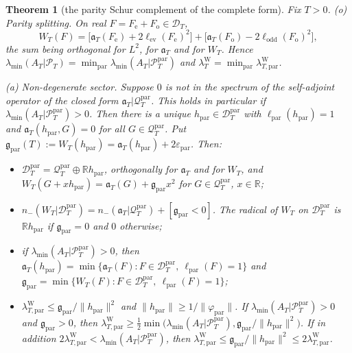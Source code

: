 \documentclass[11pt]{amsart}
\newtheorem{theorem}{Theorem}[section]
\theoremstyle{definition}
\theoremstyle{remark}
\newcommand{\R}{\mathbb R}
\newcommand{\PT}{\mathcal P_T}
\newcommand{\lamW}{\lambda^{\mathrm W}_T}
\newcommand{\lamA}{\lambda_{\min}(A_T|\PT)}
\begin{document}
\begin{theorem}[the parity Schur complement of the complete form]\label{thm:parityschur}
Fix $T>0$.
\emph{(o) Parity splitting.} On real $F=F_{\mathrm e}+F_{\mathrm o}\in\mathcal D_T$,
\[
W_T(F)=\big[\mathfrak a_T(F_{\mathrm e})+2\ell_{\mathrm{ev}}(F_{\mathrm e})^2\big]
+\big[\mathfrak a_T(F_{\mathrm o})-2\ell_{\mathrm{odd}}(F_{\mathrm o})^2\big],
\]
the sum being orthogonal for $L^2$, for $\mathfrak a_T$ and for $W_T$. Hence
$\lamA=\min_{\mathrm{par}}\lambda_{\min}(A_T|\PT^{\mathrm{par}})$ and $\lamW=\min_{\mathrm{par}}\lambda^{\mathrm W}_{T,\mathrm{par}}$.

\emph{(a) Non-degenerate sector.} Suppose $0$ is not in the spectrum of the self-adjoint operator of the
closed form $\mathfrak a_T|\mathcal Q^{\mathrm{par}}_T$. This holds in particular if
$\lambda_{\min}(A_T|\PT^{\mathrm{par}})>0$. Then there is a unique $h_{\mathrm{par}}\in\mathcal D^{\mathrm{par}}_T$
with $\ell_{\mathrm{par}}(h_{\mathrm{par}})=1$ and $\mathfrak a_T(h_{\mathrm{par}},G)=0$ for all
$G\in\mathcal Q^{\mathrm{par}}_T$. Put $\mathfrak g_{\mathrm{par}}(T):=W_T(h_{\mathrm{par}})=\mathfrak a_T(h_{\mathrm{par}})+2\varepsilon_{\mathrm{par}}$.
Then:
\begin{itemize}
\item[(a1)] $\mathcal D^{\mathrm{par}}_T=\mathcal Q^{\mathrm{par}}_T\oplus\R h_{\mathrm{par}}$, orthogonally for
$\mathfrak a_T$ and for $W_T$, and $W_T(G+xh_{\mathrm{par}})=\mathfrak a_T(G)+\mathfrak g_{\mathrm{par}}x^2$ for
$G\in\mathcal Q^{\mathrm{par}}_T$, $x\in\R$;
\item[(a2)] $n_-(W_T|\mathcal D^{\mathrm{par}}_T)=n_-(\mathfrak a_T|\mathcal Q^{\mathrm{par}}_T)+[\mathfrak g_{\mathrm{par}}<0]$.
The radical of $W_T$ on $\mathcal D^{\mathrm{par}}_T$ is $\R h_{\mathrm{par}}$ if $\mathfrak g_{\mathrm{par}}=0$ and $0$
otherwise;
\item[(a3)] if $\lambda_{\min}(A_T|\PT^{\mathrm{par}})>0$, then
$\mathfrak a_T(h_{\mathrm{par}})=\min\{\mathfrak a_T(F):F\in\mathcal D^{\mathrm{par}}_T,\ \ell_{\mathrm{par}}(F)=1\}$ and
$\mathfrak g_{\mathrm{par}}=\min\{W_T(F):F\in\mathcal D^{\mathrm{par}}_T,\ \ell_{\mathrm{par}}(F)=1\}$;
\item[(a4)] $\lambda^{\mathrm W}_{T,\mathrm{par}}\le\mathfrak g_{\mathrm{par}}/\|h_{\mathrm{par}}\|^2$ and
$\|h_{\mathrm{par}}\|\ge1/\|\varphi_{\mathrm{par}}\|$. If $\lambda_{\min}(A_T|\PT^{\mathrm{par}})>0$ \emph{and}
$\mathfrak g_{\mathrm{par}}>0$, then
$\lambda^{\mathrm W}_{T,\mathrm{par}}\ge\frac12\min\big(\lambda_{\min}(A_T|\PT^{\mathrm{par}}),\mathfrak g_{\mathrm{par}}/\|h_{\mathrm{par}}\|^2\big)$.
If in addition $2\lambda^{\mathrm W}_{T,\mathrm{par}}<\lambda_{\min}(A_T|\PT^{\mathrm{par}})$, then
$\lambda^{\mathrm W}_{T,\mathrm{par}}\le\mathfrak g_{\mathrm{par}}/\|h_{\mathrm{par}}\|^2\le2\lambda^{\mathrm W}_{T,\mathrm{par}}$.
\end{itemize}


\end{theorem}
\end{document}
